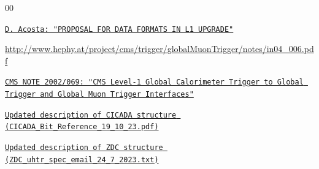 \documentclass{cmspaper}
\begin{document}
\begin{thebibliography}{00}

\href{https://indico.cern.ch/getFile.py/access?contribId=4\&sessionId=0\&resId=0\&materialId=slides\&confId=206223}{\texttt{D. Acosta: "PROPOSAL FOR DATA
FORMATS IN L1 UPGRADE"}}

\url{http://www.hephy.at/project/cms/trigger/globalMuonTrigger/notes/in04\_006.pdf}

\href{https://cds.cern.ch/record/1364214/files/in02_069.pdf}{\texttt{CMS NOTE 2002/069: "CMS Level-1 Global Calorimeter Trigger to Global
Trigger and Global Muon Trigger Interfaces"}}

\href{https://github.com/cms-l1-globaltrigger/mp7_ugt_legacy/blob/cicada_link_11_v2/doc/CICADA_Bit_Reference_19_10_23.pdf}{\texttt{Updated description of CICADA structure (CICADA\_Bit\_Reference\_19\_10\_23.pdf)}}

\href{\gitbranch/doc/scales_inputs_2_ugt/ZDC_uhtr_spec_email_24_7_2023.txt}{\texttt{Updated description of ZDC structure (ZDC\_uhtr\_spec\_email\_24\_7\_2023.txt)}}

\end{thebibliography}
\end{document}
